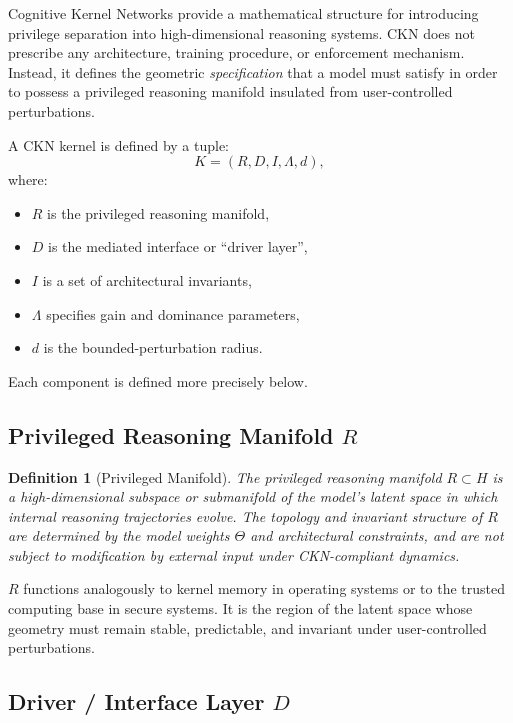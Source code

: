 \documentclass[11pt,a4paper]{article}
\newtheorem{definition}[theorem]{Definition}
\begin{document}
Cognitive Kernel Networks provide a mathematical structure for introducing privilege separation into high-dimensional reasoning systems. CKN does not prescribe any architecture, training procedure, or enforcement mechanism. Instead, it defines the geometric \emph{specification} that a model must satisfy in order to possess a privileged reasoning manifold insulated from user-controlled perturbations.

A CKN kernel is defined by a tuple:
\begin{equation}
K = (R, D, I, \Lambda, d),
\end{equation}
where:
\begin{itemize}
    \item $R$ is the privileged reasoning manifold,
    \item $D$ is the mediated interface or ``driver layer'',
    \item $I$ is a set of architectural invariants,
    \item $\Lambda$ specifies gain and dominance parameters,
    \item $d$ is the bounded-perturbation radius.
\end{itemize}

Each component is defined more precisely below.

\subsection{Privileged Reasoning Manifold $R$}

\begin{definition}[Privileged Manifold]
The privileged reasoning manifold $R \subset H$ is a high-dimensional subspace or submanifold of the model's latent space in which internal reasoning trajectories evolve. The topology and invariant structure of $R$ are determined by the model weights $\Theta$ and architectural constraints, and are not subject to modification by external input under CKN-compliant dynamics.
\end{definition}

$R$ functions analogously to kernel memory in operating systems or to the trusted computing base in secure systems. It is the region of the latent space whose geometry must remain stable, predictable, and invariant under user-controlled perturbations.

\subsection{Driver / Interface Layer $D$}
\end{document}
